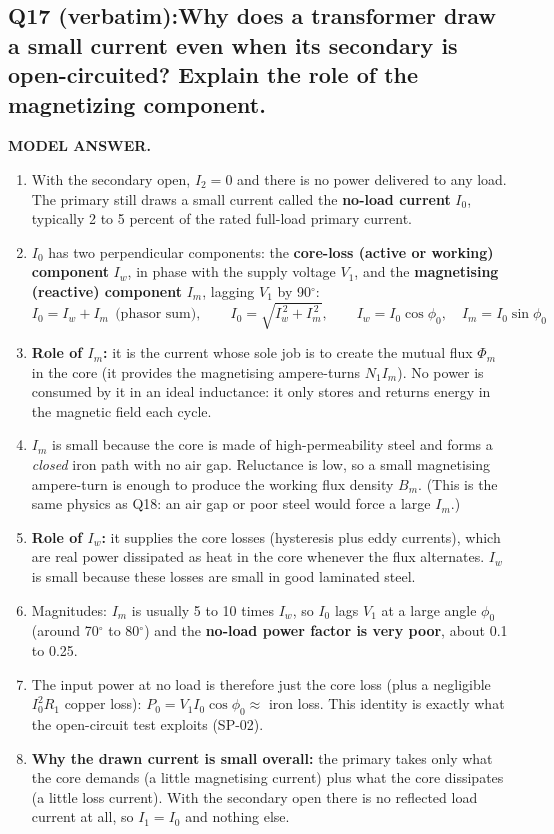 \documentclass[11pt]{article}
\newcommand{\qhead}[2]{\subsection*{\color{copper}#1\quad\color{iron}#2}}
\newcommand{\tagline}[1]{\textbf{\color{copper}#1}}
\begin{document}
\qhead{Q17 (verbatim):}{Why does a transformer draw a small current even when its secondary is open-circuited? Explain the role of the magnetizing component.}

\tagline{MODEL ANSWER.}
\begin{enumerate}[label=\arabic*.]
\item With the secondary open, $I_2 = 0$ and there is no power delivered to any load. The primary still draws a small current called the \textbf{no-load current} $I_0$, typically 2 to 5 percent of the rated full-load primary current.
\item $I_0$ has two perpendicular components: the \textbf{core-loss (active or working) component} $I_w$, in phase with the supply voltage $V_1$, and the \textbf{magnetising (reactive) component} $I_m$, lagging $V_1$ by 90$^\circ$:
\[
I_0 = I_w + I_m \ \ \text{(phasor sum)}, \qquad
I_0 = \sqrt{I_w^{\,2} + I_m^{\,2}}, \qquad
I_w = I_0\cos\phi_0, \quad I_m = I_0\sin\phi_0
\]
\item \textbf{Role of $I_m$:} it is the current whose sole job is to create the mutual flux $\Phi_m$ in the core (it provides the magnetising ampere-turns $N_1 I_m$). No power is consumed by it in an ideal inductance: it only stores and returns energy in the magnetic field each cycle.
\item $I_m$ is small because the core is made of high-permeability steel and forms a \emph{closed} iron path with no air gap. Reluctance is low, so a small magnetising ampere-turn is enough to produce the working flux density $B_m$. (This is the same physics as Q18: an air gap or poor steel would force a large $I_m$.)
\item \textbf{Role of $I_w$:} it supplies the core losses (hysteresis plus eddy currents), which are real power dissipated as heat in the core whenever the flux alternates. $I_w$ is small because these losses are small in good laminated steel.
\item Magnitudes: $I_m$ is usually 5 to 10 times $I_w$, so $I_0$ lags $V_1$ at a large angle $\phi_0$ (around 70$^\circ$ to 80$^\circ$) and the \textbf{no-load power factor is very poor}, about 0.1 to 0.25.
\item The input power at no load is therefore just the core loss (plus a negligible $I_0^2 R_1$ copper loss): $P_0 = V_1 I_0 \cos\phi_0 \approx$ iron loss. This identity is exactly what the open-circuit test exploits (SP-02).
\item \textbf{Why the drawn current is small overall:} the primary takes only what the core demands (a little magnetising current) plus what the core dissipates (a little loss current). With the secondary open there is no reflected load current at all, so $I_1 = I_0$ and nothing else.
\end{enumerate}
\end{document}
